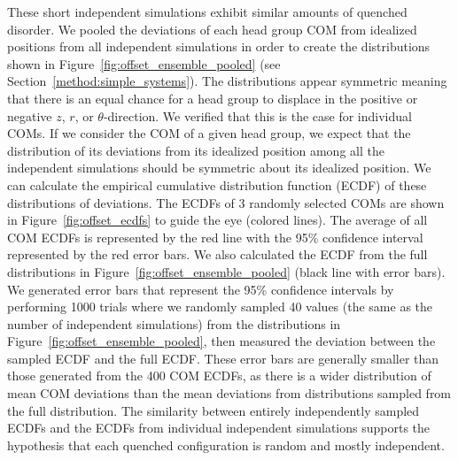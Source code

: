 \documentclass[journal=jpcbfk,manuscript=article]{achemso}
\begin{document}
  These short independent simulations exhibit similar amounts of quenched disorder. 
  We pooled the deviations of each head group COM from idealized positions
  from all independent simulations in order to create the distributions shown in 
  Figure~\ref{fig:offset_ensemble_pooled} 
  (see Section~\ref{method:simple_systems}). The distributions appear 
  symmetric meaning that there is an equal chance for a head group to displace
  in the positive or negative $z$, $r$, or $\theta$-direction. We verified that
  this is the case for individual COMs. 
  If we consider the COM of a given head group, we expect that the
  distribution of its deviations from its idealized position among all the 
  independent simulations
  should be symmetric about its idealized position. We can calculate the 
  empirical cumulative distribution function (ECDF) 
  of these distributions of deviations. 
  The ECDFs of 3 randomly selected COMs
  are shown in Figure~\ref{fig:offset_ecdfs} to guide the eye (colored lines). The average 
  of all COM ECDFs is represented by the red line with the 95\% confidence
  interval represented by the red error bars. We also calculated 
  the ECDF from the full distributions in Figure~\ref{fig:offset_ensemble_pooled}
  (black line with error bars). We generated error bars that represent the 95\% 
  confidence intervals by performing 1000 trials where we randomly sampled 40
  values (the same as the number of independent simulations) from the distributions in 
  Figure~\ref{fig:offset_ensemble_pooled}, then measured the deviation between
  the sampled ECDF and the full ECDF. These error bars are generally smaller than
  those generated from the 400 COM ECDFs, as there is a wider
  distribution of mean COM deviations than the mean deviations from distributions
  sampled from the full distribution. The similarity between entirely independently
  sampled ECDFs and the ECDFs from individual independent simulations supports 
  the hypothesis that each quenched configuration is random and mostly independent.
  
\end{document}
